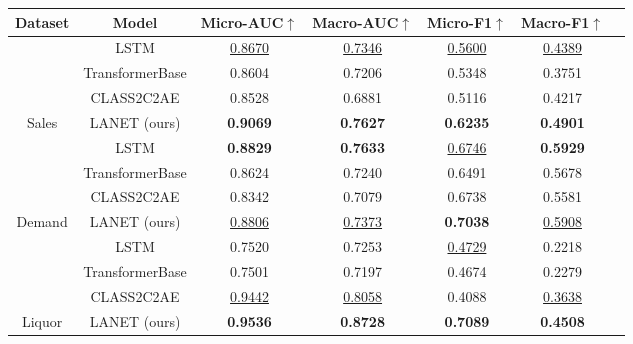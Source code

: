 \documentclass[runningheads]{llncs}
\begin{document}


\begin{table*}[t] %
\centering
\small
\begin{tabular}{ccccccc}
\hline
Dataset & Model & Micro-AUC$\uparrow$ & Macro-AUC$\uparrow$ & Micro-F1$\uparrow$ & Macro-F1$\uparrow$\\
\hline
& LSTM & \underline{0.8670} & \underline{0.7346} & \underline{0.5600} & \underline{0.4389} \\
& TransformerBase     & 0.8604 & 0.7206 & 0.5348 & 0.3751 \\
& CLASS2C2AE          & 0.8528 & 0.6881 & 0.5116 & 0.4217 \\
\multirow{-5}{*}{Sales} & LANET (ours) & \textbf{0.9069} & \textbf{0.7627} & \textbf{0.6235} & \textbf{0.4901} \\ \hline

& LSTM & \textbf{0.8829} & \textbf{0.7633} & \underline{0.6746} & \textbf{0.5929} \\
& TransformerBase & 0.8624  & 0.7240 & 0.6491 & 0.5678 \\
& CLASS2C2AE & 0.8342  & 0.7079 & 0.6738 & 0.5581\\
\multirow{-5}{*}{Demand} & LANET (ours) & \underline{0.8806} & \underline{0.7373} & \textbf{0.7038} & \underline{0.5908} \\ \hline

& LSTM & 0.7520 & 0.7253 & \underline{0.4729} & 0.2218 \\
& TransformerBase & 0.7501 & 0.7197 & 0.4674 & 0.2279 \\
& CLASS2C2AE & \underline{0.9442}  & \underline{0.8058}  & 0.4088 & \underline{0.3638}\\
\multirow{-4}{*}{Liquor} & LANET (ours) & \textbf{0.9536}  & \textbf{0.8728} & \textbf{0.7089} & \textbf{0.4508} \\ 
\hline


\end{tabular}
\end{table*}
\end{document}
